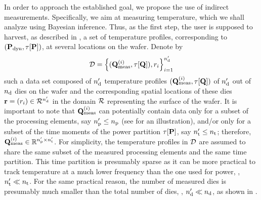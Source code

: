 In order to approach the established goal, we propose the use of indirect measurements.
Specifically, we aim at measuring temperature, which we shall analyze using Bayesian inference.
Thus, as the first step, the user is supposed to harvest, as described in , a set of temperature profiles, corresponding to $(\mathbf{P}_{\text{dyn}}, \tau[\mathbf{P}])$, at several locations on the wafer. Denote by
\[
  \mathcal{D} = \left\{ (\mathbf{Q}^{(i)}_{\text{meas}}, \tau[\mathbf{Q}]), r_i \right\}_{i = 1}^{n_\text{d}'}
\]
such a data set composed of ${n_\text{d}'}$ temperature profiles $(\mathbf{Q}^{(i)}_{\text{meas}}, \tau[\mathbf{Q}])$ of ${n_\text{d}'}$ out of ${n_\text{d}}$ dies on the wafer and the corresponding spatial locations of these dies $\mathbf{r} = (r_i) \in \mathcal{R}^{n_\text{d}'}$ in the domain $\mathcal{R}$ representing the surface of the wafer.
It is important to note that $\mathbf{Q}^{(i)}_{\text{meas}}$ can potentially contain data only for a subset of the processing elements, say ${n_\text{p}'} \leq {n_\text{p}}$ (see  for an illustration), and/or only for a subset of the time moments of the power partition $\tau[\mathbf{P}]$, say ${n_\text{t}'} \leq {n_\text{t}}$; therefore, $\mathbf{Q}^{(i)}_{\text{meas}} \in \mathbb{R}^{{n_\text{p}'} \times {n_\text{t}'}}$.
For simplicity, the temperature profiles in $\mathcal{D}$ are assumed to share the same subset of the measured processing elements and the same time partition.
This time partition is presumably sparse as it can be more practical to track temperature at a much lower frequency than the one used for power, \ie, ${n_\text{t}'} \ll {n_\text{t}}$.
For the same practical reason, the number of measured dies is presumably much smaller than the total number of dies, \ie, ${n_\text{d}'} \ll {n_\text{d}}$, as shown in .
